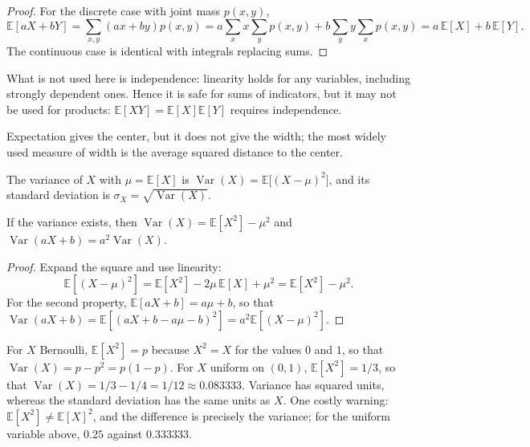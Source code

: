 \begin{proof}
For the discrete case with joint mass $p(x,y)$,
\[
\mathbb{E}[aX+bY]=\sum_{x,y}(ax+by)p(x,y)
=a\sum_x x\sum_y p(x,y)+b\sum_y y\sum_x p(x,y)=a\,\mathbb{E}[X]+b\,\mathbb{E}[Y].
\]
The continuous case is identical with integrals replacing sums.
\end{proof}

What is not used here is independence: linearity holds for any variables,
including strongly dependent ones. Hence it is safe for sums of indicators, but it may not
be used for products: $\mathbb{E}[XY]=\mathbb{E}[X]\mathbb{E}[Y]$ requires
independence.

Expectation gives the center, but it does not give the width; the most widely used measure of width
is the average squared distance to the center.

\begin{definisi}[Variance]
The variance of $X$ with $\mu=\mathbb{E}[X]$ is
$\operatorname{Var}(X)=\mathbb{E}\bigl[(X-\mu)^2\bigr]$, and its standard deviation is
$\sigma_X=\sqrt{\operatorname{Var}(X)}$.
\end{definisi}

\begin{proposisi}
If the variance exists, then $\operatorname{Var}(X)=\mathbb{E}[X^2]-\mu^2$ and
$\operatorname{Var}(aX+b)=a^2\operatorname{Var}(X)$.
\end{proposisi}

\begin{proof}
Expand the square and use linearity:
\[
\mathbb{E}[(X-\mu)^2]=\mathbb{E}[X^2]-2\mu\,\mathbb{E}[X]+\mu^2
=\mathbb{E}[X^2]-\mu^2 .
\]
For the second property, $\mathbb{E}[aX+b]=a\mu+b$, so that
$\operatorname{Var}(aX+b)=\mathbb{E}[(aX+b-a\mu-b)^2]=a^2\mathbb{E}[(X-\mu)^2]$.
\end{proof}

For $X$ Bernoulli, $\mathbb{E}[X^2]=p$ because $X^2=X$ for the values $0$ and $1$,
so that $\operatorname{Var}(X)=p-p^2=p(1-p)$. For $X$ uniform on $(0,1)$,
$\mathbb{E}[X^2]=1/3$, so that $\operatorname{Var}(X)=1/3-1/4=1/12\approx0.083333$.
Variance has squared units, whereas the standard deviation has the same units as $X$. One
costly warning: $\mathbb{E}[X^2]\ne\mathbb{E}[X]^2$, and the difference is precisely
the variance; for the uniform variable above, $0.25$ against $0.333333$.

